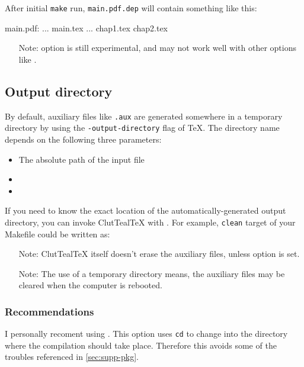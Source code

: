 \documentclass[a4paper, 11pt]{scrartcl}
\let\TeXold\TeX
\newcommand\CluttealTeX{ClutTeal\TeX\xspace}
\renewcommand\TeX{\TeXold\xspace}
\begin{document}
After initial \texttt{make} run, \texttt{main.pdf.dep} will contain something like this:
\begin{boxcodemake}
main.pdf: ... main.tex ... chap1.tex chap2.tex
\end{boxcodemake}

\begin{itemize}
	\item[Note:]  option is still experimental, and may not work well with other options like .
\end{itemize}

\subsection{Output directory} \label{sec:output-dir}
By default, auxiliary files like \texttt{.aux} are generated somewhere in a temporary directory by using the \texttt{-output-directory} flag of \TeX.
The directory name depends on the following three parameters:
\begin{itemize}
	\item The absolute path of the input file
	\item {}
	\item {}
\end{itemize}

If you need to know the exact location of the automatically-generated output directory, you can invoke \CluttealTeX with .
For example, \texttt{clean} target of your Makefile could be written as:

\begin{itemize}
	\item[Note:] \CluttealTeX itself doesn't erase the auxiliary files, unless  option is set.
	\item[Note:] The use of a temporary directory means, the auxiliary files may be cleared when the computer is rebooted.
\end{itemize}

\subsubsection{Recommendations}
I personally recoment using .
This option uses \texttt{cd} to change into the directory where the compilation should take place.
Therefore this avoids some of the troubles referenced in \cref{sec:supp-pkg}.
\end{document}
